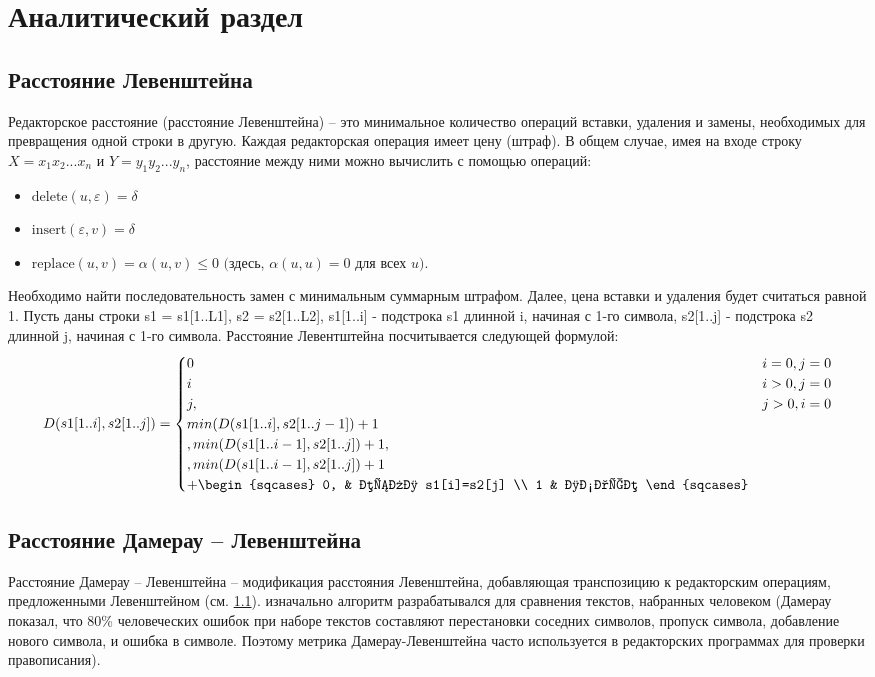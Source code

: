 \chapter{Аналитический раздел}\label{analyth}

\section{Расстояние Левенштейна}\label{defs}

Редакторское расстояние (расстояние Левенштейна) -- это минимальное количество операций вставки, удаления и замены, необходимых для превращения одной строки в другую. Каждая редакторская операция имеет цену (штраф). 
В общем случае, имея на входе строку $X = x_1x_2...x_n$ и $Y = y_1y_2...y_n$, расстояние между ними можно вычислить с помощью операций:
\begin{itemize}
	\item ${\text{delete}(u, \varepsilon) = \delta}$
	\item $\text{insert}(\varepsilon, v) = \delta$
	\item $\text{replace}(u, v) = \alpha(u, v) \leq 0$  $($здесь, $\alpha(u, u) = 0$ для всех $u).$
\end{itemize}

Необходимо найти последовательность замен с минимальным суммарным штрафом. Далее, цена вставки и удаления будет считаться равной 1.
 Пусть даны строки s1 = s1[1..L1], s2 = s2[1..L2], s1[1..i] - подстрока s1 длинной i, начиная с 1-го символа, s2[1..j] - подстрока s2 длинной j, начиная с 1-го символа. Расстояние Левентштейна посчитывается следующей формулой:
\begin{equation}\label{form:lev}
	D(s1[1..i], s2[1..j]) =
	\begin{cases}
		0       & i = 0, j =0\\
		i  & i > 0, j =0 \\
		j, & j > 0, i = 0 \\
		min(D(s1[1..i], s2[1..j-1]) + 1\\, 
		min(D(s1[1..i-1], s2[1..j]) + 1, \\,
		min(D(s1[1..i-1], s2[1..j]) + 1 \\ + 
		\begin{sqcases}
			0, & если s1[i]=s2[j] \\
			1 & иначе
		\end{sqcases}
	\end{cases}
\end{equation}


\section{Расстояние Дамерау -- Левенштейна}
Расстояние Дамерау -- Левенштейна -- модификация расстояния Левенштейна, добавляющая транспозицию к редакторским операциям, предложенными Левенштейном (см. \ref{defs}). изначально алгоритм разрабатывался для сравнения текстов, набранных человеком (Дамерау показал\cite{damerau}, что 80\% человеческих ошибок при наборе текстов составляют перестановки соседних символов, пропуск символа, добавление нового символа, и ошибка в символе. Поэтому метрика Дамерау-Левенштейна часто используется в редакторских программах для проверки правописания). 

